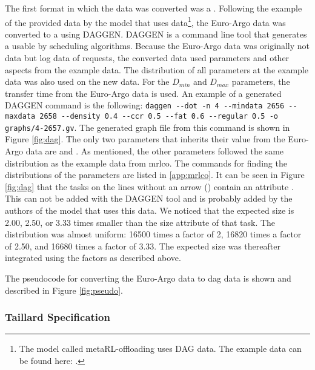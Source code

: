 \begin{sloppypar}

    The first format in which the data was converted was a \DAG. Following the
    example of the provided data by the model that uses \DAG data\footnote{The
    model called metaRL-offloading uses DAG data. The example data can be
    found here: \urlmetadata.}, the Euro-Argo data was converted to a \DAG
    using DAGGEN. DAGGEN is a command line
    tool that generates a \DAG usable by scheduling algorithms. Because the
    Euro-Argo data was originally not \jss data but log data of requests, the
    converted data used parameters and other aspects from the example data.
    The distribution of all parameters at the example data was also used on
    the new data. For the $D_{min}$ and $D_{max}$ parameters, the transfer
    time from the Euro-Argo data is used. An example of a generated DAGGEN
    command is the following: \texttt{daggen -{}-dot -n 4 -{}-mindata 2656
    -{}-maxdata 2658 -{}-density 0.4 -{}-ccr 0.5 -{}-fat 0.6 -{}-regular 0.5
    -o graphs/4-2657.gv}. The generated graph file from this command is shown
    in Figure \ref{fig:dag}. The only two parameters that inherits their value
    from the Euro-Argo data are  and . As
    mentioned, the other parameters followed the same distribution as the
    example data from \gls{mrlco}. The commands for finding the distributions
    of the parameters are listed in \ref{app:mrlco}. It can be seen in Figure
    \ref{fig:dag} that the tasks on the lines without an arrow (\code{->})
    contain an attribute . This can not be added with the
    DAGGEN tool and is probably added by the authors of the model that uses
    this data. We noticed that the expected size is 2.00, 2.50, or 3.33 times
    smaller than the size attribute of that task. The distribution was almost
    uniform: 16500 times a factor of 2, 16820 times a factor of 2.50, and
    16680 times a factor of 3.33. The expected size was thereafter integrated
    using the factors as described above.

\end{sloppypar}




The pseudocode for converting the Euro-Argo data to \gls{dag} data is shown
and described in Figure \ref{fig:pseudo}.



\subsubsection{Taillard Specification}\label{sec:taillard}

